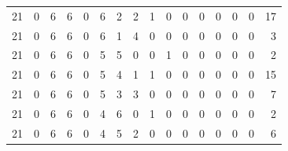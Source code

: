 \begin{appendix}
{\begin{longtable}{lrrrrrrrrrrrrrrr}
    21        & 0  & 6  & 6  & 0  & 6  & 2  & 2  & 1  & 0  & 0  & 0  & 0   & 0   & 0   & 17   \\
    21        & 0  & 6  & 6  & 0  & 6  & 1  & 4  & 0  & 0  & 0  & 0  & 0   & 0   & 0   & 3    \\
    21        & 0  & 6  & 6  & 0  & 5  & 5  & 0  & 0  & 1  & 0  & 0  & 0   & 0   & 0   & 2    \\
    21        & 0  & 6  & 6  & 0  & 5  & 4  & 1  & 1  & 0  & 0  & 0  & 0   & 0   & 0   & 15   \\
    21        & 0  & 6  & 6  & 0  & 5  & 3  & 3  & 0  & 0  & 0  & 0  & 0   & 0   & 0   & 7    \\
    21        & 0  & 6  & 6  & 0  & 4  & 6  & 0  & 1  & 0  & 0  & 0  & 0   & 0   & 0   & 2    \\
    21        & 0  & 6  & 6  & 0  & 4  & 5  & 2  & 0  & 0  & 0  & 0  & 0   & 0   & 0   & 6    \\
\end{longtable}}

\end{appendix}
